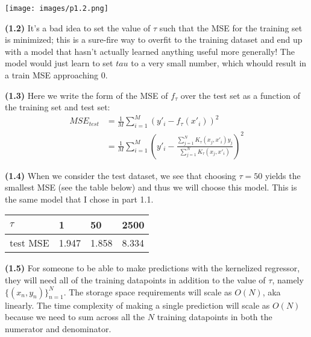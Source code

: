 \documentclass[submit]{harvardml}
\renewcommand{\part}[1] {\vspace{.10in} {\bf (#1)}}
\begin{document}
\texttt{[image: images/p1.2.png]}


\part{1.2} It's a bad idea to set the value of $\tau$ such that the MSE for the training set is minimized; this is a sure-fire way to overfit to the training dataset and end up with a model that hasn't actually learned anything useful more generally! The model would just learn to set $tau$ to a very small number, which whould result in a train MSE approaching 0.

\part{1.3} Here we write the form of the MSE of $f_\tau$ over the test set as a function of the training set and test set:
\begin{align*}
  MSE_{test} &= \frac{1}{M}\sum_{i=1}^M \left(y'_i - f_\tau(x'_i)\right)^2 \\
  &= \frac{1}{M}\sum_{i=1}^M \left(y'_i - \frac{\sum_{j=1}^N K_\tau(x_j, x'_i)y_j}{\sum_{j=1}^N K_\tau(x_j, x'_i)}\right)^2
\end{align*}

\part{1.4} When we consider the test dataset, we see that choosing $\tau=50$ yields the smallest MSE (see the table below) and thus we will choose this model. This is the same model that I chose in part 1.1.

\begin{table}[hbt!]
  \begin{tabular}{llll}
  $\tau$   & 1     & 50    & 2500  \\ \hline
  test MSE & 1.947 & 1.858 & 8.334 \\ \hline
  \end{tabular}
  \end{table}

\part{1.5} For someone to be able to make predictions with the kernelized regressor, they will need all of the training datapoints in addition to the value of $\tau$, namely $\{(x_n, y_n)\}_{n = 1} ^N$. The storage space requirements will scale as $O(N)$, aka linearly. The time complexity of making a single prediction will scale as $O(N)$ because we need to sum across all the $N$ training datapoints in both the numerator and denominator.
\end{document}
